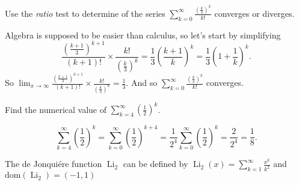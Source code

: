 \documentclass[12pt, answers,fleqn]{exam}
\begin{document}
\begin{questions}
\question [1] Use the \emph{ratio} test to determine of the series $\sum_{k=0}^\infty \frac{  \left(\frac{k}{3} \right)^k }{ k!}$ converges or diverges.
\begin{solution}%
Algebra is supposed to be easier than calculus, so let's start by simplifying
\begin{equation*}
\frac{ (\frac{k+1}{3})^{k+1}}{(k+1)!} \times \frac{k!}{ \left(\frac{k}{3} \right)^k} = 
\frac{1}{3} (\frac{k+1}{k})^k = \frac{1}{3}  \left(1 + \frac{1}{k} \right)^k.
\end{equation*}
So $\displaystyle  \lim_{x \to \infty} \frac{ (\frac{k+1}{3})^{k+1}}{(k+1)!} \times \frac{k!}{ (\frac{k}{3})^k} = \frac{1}{3}$.
And so $\displaystyle \sum_{k=0}^\infty \frac{  \left(\frac{k}{3} \right)^k }{ k!}$ converges. 
\end{solution}



\question [5] Find the numerical value of  \(\displaystyle \sum_{k=4}^\infty \left(\frac{1}{2} \right)^k \).
\begin{solution}[2.5in]
\[
 \sum_{k=4}^\infty \left(\frac{1}{2} \right)^k = \sum_{k=0}^\infty \left(\frac{1}{2} \right)^{k + 4}
  = \frac{1}{2^4} \sum_{k=0}^\infty \left(\frac{1}{2} \right)^{k} = \frac{2}{2^4} = \frac{1}{8}.
\]
\end{solution}


\question The de Jonqui\'ere function \(\operatorname{Li}_2\) can be defined by 
\(\displaystyle
  \operatorname{Li}_2(x) = \sum_{k=1}^\infty \frac{x^k}{k^2}
\) and $\mathrm{dom}(\operatorname{Li}_2) = (-1,1)$

\end{questions}
\end{document}
